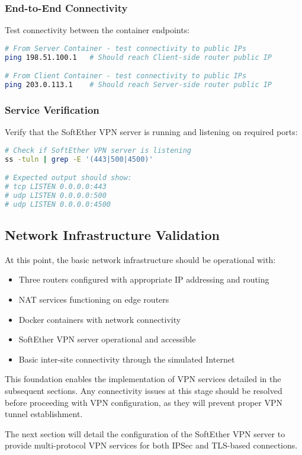 \subsubsection{End-to-End Connectivity}

Test connectivity between the container endpoints:

\begin{lstlisting}[language=bash]
# From Server Container - test connectivity to public IPs
ping 198.51.100.1   # Should reach Client-side router public IP

# From Client Container - test connectivity to public IPs
ping 203.0.113.1    # Should reach Server-side router public IP
\end{lstlisting}

\subsubsection{Service Verification}

Verify that the SoftEther VPN server is running and listening on required ports:

\begin{lstlisting}[language=bash]
# Check if SoftEther VPN server is listening
ss -tuln | grep -E '(443|500|4500)'

# Expected output should show:
# tcp LISTEN 0.0.0.0:443
# udp LISTEN 0.0.0.0:500  
# udp LISTEN 0.0.0.0:4500
\end{lstlisting}

\subsection{Network Infrastructure Validation}

At this point, the basic network infrastructure should be operational with:

\begin{itemize}
    \item Three routers configured with appropriate IP addressing and routing
    \item NAT services functioning on edge routers
    \item Docker containers with network connectivity
    \item SoftEther VPN server operational and accessible
    \item Basic inter-site connectivity through the simulated Internet
\end{itemize}

\noindent
This foundation enables the implementation of VPN services detailed in the subsequent sections. Any connectivity issues at this stage should be resolved before proceeding with VPN configuration, as they will prevent proper VPN tunnel establishment.

\noindent
The next section will detail the configuration of the SoftEther VPN server to provide multi-protocol VPN services for both IPSec and TLS-based connections.
